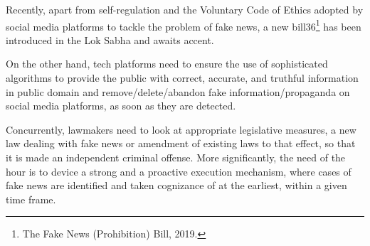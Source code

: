\begin{multicols}{2}
\noi
Recently, apart from self-regulation and the Voluntary Code of Ethics adopted by social
media platforms to tackle the problem of fake news, a new bill36\footnote{The Fake News (Prohibition) Bill, 2019.} has been introduced in the
Lok Sabha and awaits accent.

\noi
On the other hand, tech platforms need to ensure the use of sophisticated algorithms to
provide the public with correct, accurate, and truthful information in public domain and
remove/delete/abandon fake information/propaganda on social media platforms, as soon as
they are detected.

\noi
Concurrently, lawmakers need to look at appropriate legislative measures, a new law dealing
with fake news or amendment of existing laws to that effect, so that it is made an independent
criminal offense. More significantly, the need of the hour is to device a strong and a proactive
execution mechanism, where cases of fake news are identified and taken cognizance of at the
earliest, within a given time frame. 

\end{multicols}
